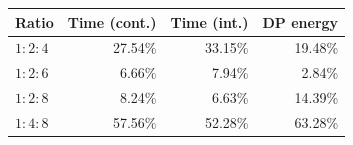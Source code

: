 \begin{tabular*}{\linewidth}{@{\extracolsep{\fill}}lrrr@{}}\toprule
Ratio & Time (cont.) & Time (int.) & DP energy \\\midrule
$1:2:4$ & 27.54\% & 33.15\% & 19.48\% \\
$1:2:6$ & 6.66\% & 7.94\% & 2.84\% \\
$1:2:8$ & 8.24\% & 6.63\% & 14.39\% \\
$1:4:8$ & 57.56\% & 52.28\% & 63.28\% \\
\bottomrule\end{tabular*}
